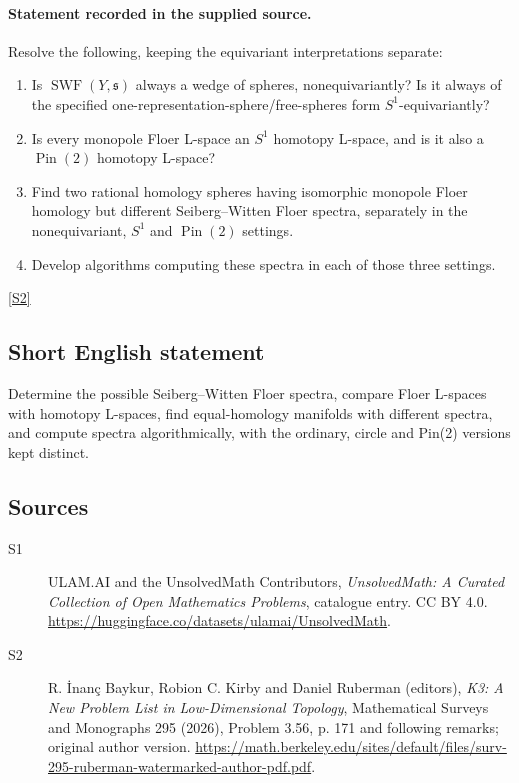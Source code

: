 \documentclass[11pt]{article}
\newcommand{\sref}[2]{\hyperlink{source:#1:#2}{[S#2]}}
\begin{document}
\paragraph{Statement recorded in the supplied source.}
Resolve the following, keeping the equivariant interpretations separate:
\begin{enumerate}
\item Is $\operatorname{SWF}(Y,\mathfrak s)$ always a wedge of spheres, nonequivariantly? Is it always of the specified one-representation-sphere/free-spheres form $S^1$-equivariantly?
\item Is every monopole Floer L-space an $S^1$ homotopy L-space, and is it also a $\operatorname{Pin}(2)$ homotopy L-space?
\item Find two rational homology spheres having isomorphic monopole Floer homology but different Seiberg--Witten Floer spectra, separately in the nonequivariant, $S^1$ and $\operatorname{Pin}(2)$ settings.
\item Develop algorithms computing these spectra in each of those three settings.
\end{enumerate}
\sref{statement}{2}
\subsection{Short English statement}
Determine the possible Seiberg--Witten Floer spectra, compare Floer L-spaces with homotopy L-spaces, find equal-homology manifolds with different spectra, and compute spectra algorithmically, with the ordinary, circle and Pin(2) versions kept distinct.
\subsection{Sources}
\begin{description}
\item[\hypertarget{source:statement:1}{S1}] ULAM.AI and the UnsolvedMath Contributors, \emph{UnsolvedMath: A Curated Collection of Open Mathematics Problems}, catalogue entry. CC BY 4.0. \url{https://huggingface.co/datasets/ulamai/UnsolvedMath}.
\item[\hypertarget{source:statement:2}{S2}] R. İnanç Baykur, Robion C. Kirby and Daniel Ruberman (editors), \emph{K3: A New Problem List in Low-Dimensional Topology}, Mathematical Surveys and Monographs 295 (2026), Problem 3.56, p. 171 and following remarks; original author version. \url{https://math.berkeley.edu/sites/default/files/surv-295-ruberman-watermarked-author-pdf.pdf}.
\end{description}
\label{end:statement}
\end{document}
